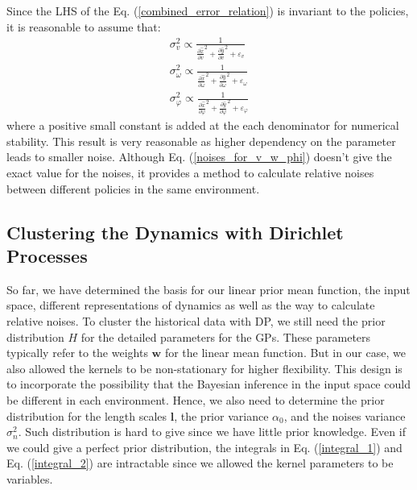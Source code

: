 Since the LHS of the Eq. (\ref{combined_error_relation}) is invariant to the policies, it is reasonable to assume that:
\begin{equation}
\begin{gathered}
\sigma_v^2 \propto
\frac{1}{
\frac{\partial \hat{x}}{\partial v}^2 
+ \frac{\partial \hat{y}}{\partial v}^2 + \varepsilon_v}
\\
\sigma_{\omega}^2 \propto
\frac{1}{
\frac{\partial \hat{x}}{\partial \omega}^2
+
\frac{\partial \hat{y}}{\partial \omega}^2 + \varepsilon_{\omega}} 
\\
\sigma_{\varphi}^2 \propto
\frac{1}{
\frac{\partial \hat{x}}{\partial \varphi}^2
+ 
\frac{\partial \hat{y}}{\partial \varphi}^2 + \varepsilon_{\varphi}} 
\end{gathered}
\label{noises_for_v_w_phi}
\end{equation}
where a positive small constant is added at the each denominator for numerical stability.
This result is very reasonable as higher dependency on the parameter leads to smaller noise.
Although Eq. (\ref{noises_for_v_w_phi}) doesn't give the exact value for the noises, it provides a method to calculate relative noises between different policies in the same environment.



\subsection{Clustering the Dynamics with Dirichlet Processes}
So far, we have determined the basis for our linear prior mean function, the input space, different representations of dynamics as well as the way to calculate relative noises.
To cluster the historical data with DP, we still need the prior distribution $H$ for the detailed parameters for the GPs. 
These parameters typically refer to the weights $\bm{w}$ for the linear mean function.
But in our case, we also allowed the kernels to be non-stationary for higher flexibility.
This design is to incorporate the possibility that the Bayesian inference in the input space could be different in each environment.
Hence, we also need to determine the prior distribution for the length scales $\bm{l}$, the prior variance $\alpha_0$, and the noises variance $\sigma_{n}^2$.
Such distribution is hard to give since we have little prior knowledge.
Even if we could give a perfect prior distribution, the integrals in Eq. (\ref{integral_1}) and Eq. (\ref{integral_2}) are intractable since we allowed the kernel parameters to be variables.


